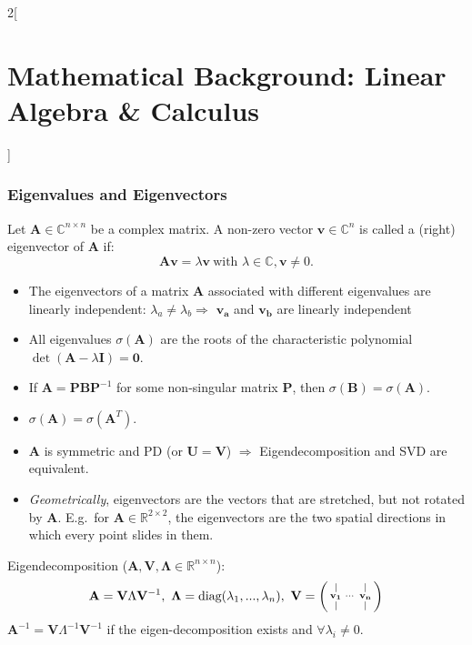 \documentclass[oneside,fontsize=11pt,paper=a4]{scrartcl}
\begin{document}
\begin{multicols}{2}[\section{Mathematical Background: Linear Algebra \& Calculus}]
\subsubsection{Eigenvalues and Eigenvectors}
Let $\mathbf{A} \in \mathbb{C}^{n \times n}$ be a complex matrix. A non-zero vector $\mathbf{v} \in \mathbb{C}^{n}$ is called a (right) eigenvector of $\mathbf{A}$ if:
\begin{equation*}
    \mathbf{A}\mathbf{v} = \lambda \mathbf{v} \ \text{with } \lambda \in \mathbb{C}, \mathbf{v} \neq 0.
\end{equation*}
\begin{itemize}
    \setlength\itemsep{-0.1em}
    \item The eigenvectors of a matrix $\mathbf{A}$ associated with different eigenvalues are linearly independent: $\lambda_a \neq \lambda_b \Rightarrow$ $\mathbf{v_a}$ and $\mathbf{v_b}$ are linearly independent
    \item All eigenvalues $\sigma (\mathbf{A})$ are the roots of the characteristic polynomial $\det(\mathbf{A}-\lambda \mathbf{I}) = \mathbf{0}$.
    \item If $\mathbf{A} = \mathbf{P}\mathbf{B}\mathbf{P}^{-1}$ for some non-singular matrix $\mathbf{P}$, then $\sigma (\mathbf{B}) = \sigma (\mathbf{A})$.
    \item $\sigma (\mathbf{A}) = \sigma (\mathbf{A}^T)$.
    \item $\mathbf{A}$ is symmetric and PD (or $\mathbf{U} = \mathbf{V}$) $\Rightarrow$ Eigendecomposition and SVD are equivalent.
    \item \textit{Geometrically},  eigenvectors are the vectors that are stretched, but not rotated by $\mathbf{A}$. E.g.\ for $\mathbf{A}\in\mathbb{R}^{2\times2}$, the eigenvectors are the two spatial directions in which every point slides in them.
\end{itemize}
Eigendecomposition ($\mathbf{A}, \mathbf{V}, \mathbf{\Lambda} \in \mathbb{R}^{n \times n}$):
\begin{equation*}
	\mathbf{A} = \mathbf{V} \Lambda \mathbf{V}^{-1}, \ \mathbf{\Lambda} = \text{diag}(\lambda_1, ..., \lambda_n),\
	\mathbf{V} =
	\begin{psmallmatrix}
		\vert &  & \vert \\
		\mathbf{v_1} & \cdots  & \mathbf{v_n} \\
		\vert &  & \vert \\
	\end{psmallmatrix}
\end{equation*}
$\mathbf{A}^{-1} = \mathbf{V} \Lambda^{-1} \mathbf{V}^{-1}$ if the eigen-decomposition exists and $\forall\lambda_i\neq0$.


\end{multicols}
\end{document}
